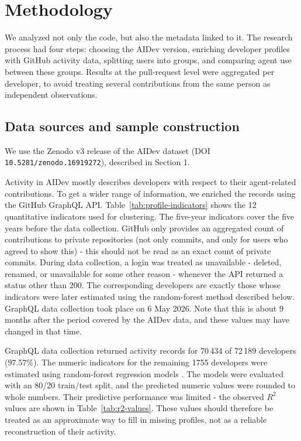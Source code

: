 \section{Methodology}\label{sec:method}

We analyzed not only the code, but also the metadata linked to it. The research process had four steps: choosing the AIDev version, enriching developer profiles with GitHub activity data, splitting users into groups, and comparing agent use between these groups. Results at the pull-request level were aggregated per developer, to avoid treating several contributions from the same person as independent observations.

\subsection{Data sources and sample construction}

We use the Zenodo v3 release of the AIDev dataset (DOI \texttt{10.5281/zenodo.16919272}), described in Section 1.

Activity in AIDev mostly describes developers with respect to their agent-related contributions. To get a wider range of information, we enriched the records using the GitHub GraphQL API. Table~\ref{tab:profile-indicators} shows the 12 quantitative indicators used for clustering. The five-year indicators cover the five years before the data collection. GitHub only provides an aggregated count of contributions to private repositories (not only commits, and only for users who agreed to show this) - this should not be read as an exact count of private commits. During data collection, a login was treated as unavailable - deleted, renamed, or unavailable for some other reason - whenever the API returned a status other than 200. The corresponding developers are exactly those whose indicators were later estimated using the random-forest method described below. GraphQL data collection took place on 6 May 2026. Note that this is about 9 months after the period covered by the AIDev data, and these values may have changed in that time.

GraphQL data collection returned activity records for 70\,434 of 72\,189 developers (97.57\%). The numeric indicators for the remaining 1755 developers were estimated using random-forest regression models \cite{breiman2001random}. The models were evaluated with an 80/20 train/test split, and the predicted numeric values were rounded to whole numbers. Their predictive performance was limited - the observed $R^2$ values are shown in Table~\ref{tab:r2-values}. These values should therefore be treated as an approximate way to fill in missing profiles, not as a reliable reconstruction of their activity.

